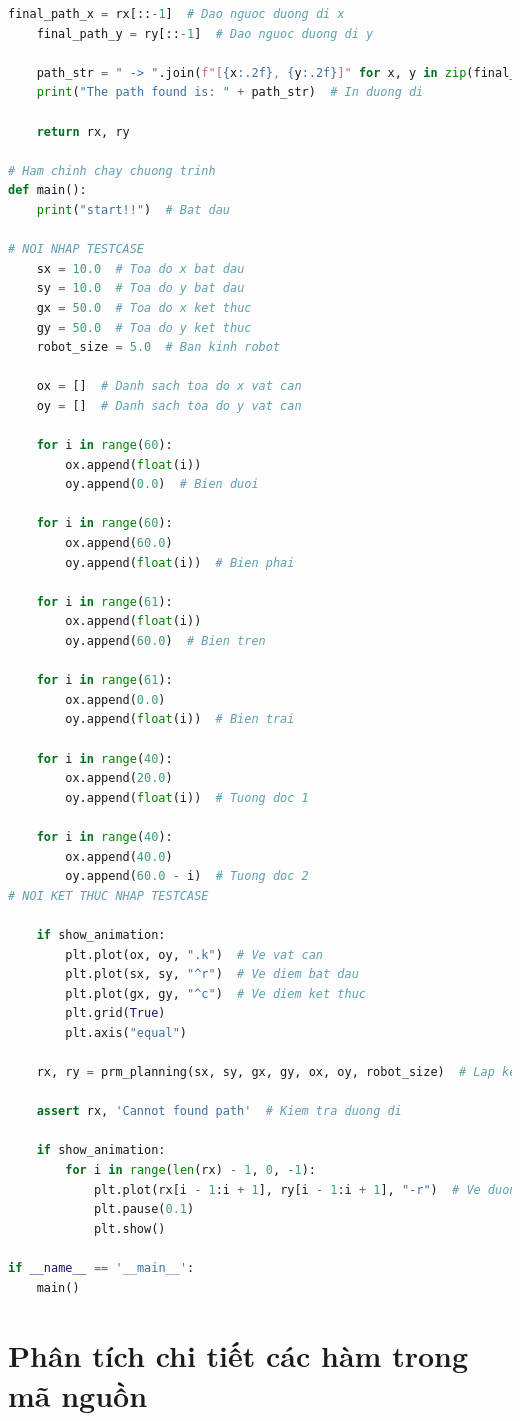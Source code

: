 \documentclass[12pt,a4paper,openany,oneside]{report}
\begin{document}
\begin{lstlisting}[language=Python, caption=Cài đặt thuật toán PRM bằng Python]
    final_path_x = rx[::-1]  # Dao nguoc duong di x
    final_path_y = ry[::-1]  # Dao nguoc duong di y

    path_str = " -> ".join(f"[{x:.2f}, {y:.2f}]" for x, y in zip(final_path_x, final_path_y))
    print("The path found is: " + path_str)  # In duong di

    return rx, ry

# Ham chinh chay chuong trinh
def main():
    print("start!!")  # Bat dau
    
# NOI NHAP TESTCASE
    sx = 10.0  # Toa do x bat dau
    sy = 10.0  # Toa do y bat dau
    gx = 50.0  # Toa do x ket thuc
    gy = 50.0  # Toa do y ket thuc
    robot_size = 5.0  # Ban kinh robot

    ox = []  # Danh sach toa do x vat can
    oy = []  # Danh sach toa do y vat can

    for i in range(60):
        ox.append(float(i))
        oy.append(0.0)  # Bien duoi

    for i in range(60):
        ox.append(60.0)
        oy.append(float(i))  # Bien phai

    for i in range(61):
        ox.append(float(i))
        oy.append(60.0)  # Bien tren

    for i in range(61):
        ox.append(0.0)
        oy.append(float(i))  # Bien trai

    for i in range(40):
        ox.append(20.0)
        oy.append(float(i))  # Tuong doc 1

    for i in range(40):
        ox.append(40.0)
        oy.append(60.0 - i)  # Tuong doc 2
# NOI KET THUC NHAP TESTCASE

    if show_animation:
        plt.plot(ox, oy, ".k")  # Ve vat can
        plt.plot(sx, sy, "^r")  # Ve diem bat dau
        plt.plot(gx, gy, "^c")  # Ve diem ket thuc
        plt.grid(True)
        plt.axis("equal")

    rx, ry = prm_planning(sx, sy, gx, gy, ox, oy, robot_size)  # Lap ke hoach duong di

    assert rx, 'Cannot found path'  # Kiem tra duong di

    if show_animation:
        for i in range(len(rx) - 1, 0, -1):
            plt.plot(rx[i - 1:i + 1], ry[i - 1:i + 1], "-r")  # Ve duong di
            plt.pause(0.1)
            plt.show()

if __name__ == '__main__':
    main()
\end{lstlisting}

\section{Phân tích chi tiết các hàm trong mã nguồn}
\end{document}
